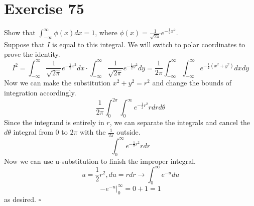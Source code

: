 \documentclass{article}
\begin{document}
\section*{Exercise 75}
\begin{flushleft}
    Show that $\int_{-\infty}^{\infty}{\phi(x)dx} = 1$, where $\phi(x) = \frac{1}{\sqrt{2\pi}}e^{-\frac{1}{2}x^2}$. \\
    Suppose that $I$ is equal to this integral. We will switch to polar coordinates to prove the identity.
    \begin{equation*}
        I^2 = \int_{-\infty}^{\infty}{\frac{1}{\sqrt{2\pi}}e^{-\frac{1}{2}x^2}dx} \cdot \int_{-\infty}^{\infty}{\frac{1}{\sqrt{2\pi}}e^{-\frac{1}{2}y^2}dy}
        = \frac{1}{2\pi}\int_{-\infty}^{\infty} \int_{-\infty}^{\infty}{e^{-\frac{1}{2}(x^2 + y^2)}dxdy}
    \end{equation*}
    Now we can make the substitution $x^2 + y^2 = r^2$ and change the bounds of integration accordingly.
    \begin{equation*}
        \frac{1}{2\pi} \int_{0}^{2\pi} \int_{0}^{\infty}{e^{-\frac{1}{2}r^2}rdrd\theta}
    \end{equation*}
    Since the integrand is entirely in $r$, we can separate the integrals and cancel the $d\theta$ integral from 0 to $2\pi$ with the $\frac{1}{2\pi}$ outside.
    \begin{equation*}
        \int_{0}^{\infty}{e^{-\frac{1}{2}r^2}}rdr
    \end{equation*}
    Now we can use u-substitution to finish the improper integral.
    \begin{equation*}
        u = \frac{1}{2}r^2, du = rdr \rightarrow \int_{0}^{\infty}{e^{-u}du}
    \end{equation*}
    \begin{equation*}
        -e^{-u} \rvert_{0}^{\infty} = 0 + 1 = 1
    \end{equation*}
    as desired. $\square$
\end{flushleft}
\end{document}
